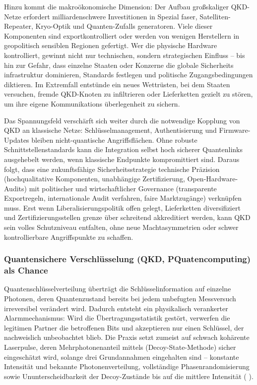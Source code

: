 {Hinzu kommt die makroökonomische Dimension: Der Aufbau großskaliger QKD-Netze erfordert milliardenschwere Investitionen in Spezial faser, Satelliten-Repeater, Kryo-Optik und Quanten-Zufalls generatoren. Viele dieser Komponenten sind exportkontrolliert oder werden von wenigen Herstellern in geopolitisch sensiblen Regionen gefertigt. Wer die physische Hardware kontrolliert, gewinnt nicht nur technischen, sondern strategischen Einfluss – bis hin zur Gefahr, dass einzelne Staaten oder Konzerne die globale Sicherheits infrastruktur dominieren, Standards festlegen und politische Zugangsbedingungen diktieren. Im Extremfall entstünde ein neues Wettrüsten, bei dem Staaten versuchen, fremde QKD-Knoten zu infiltrieren oder Lieferketten gezielt zu stören, um ihre eigene Kommunikations überlegenheit zu sichern.

Das Spannungsfeld verschärft sich weiter durch die notwendige Kopplung von QKD an klassische Netze: Schlüsselmanagement, Authentisierung und Firmware-Updates bleiben nicht-quantische Angriffsflächen. Ohne robuste Schnittstellenstandards kann die Integration selbst hoch sicherer Quantenlinks ausgehebelt werden, wenn klassische Endpunkte kompromittiert sind. Daraus folgt, dass eine zukunftsfähige Sicherheitsstrategie technische Präzision (hochqualitative Komponenten, unabhängige Zertifizierung, Open-Hardware-Audits) mit politischer und wirtschaftlicher Governance (transparente Exportregeln, internationale Audit verfahren, faire Marktzugänge) verknüpfen muss. Erst wenn Liberalisierungspolitik offen gelegt, Lieferketten diversifiziert und Zertifizierungsstellen grenze über schreitend akkreditiert werden, kann QKD sein volles Schutzniveau entfalten, ohne neue Machtasymmetrien oder schwer kontrollierbare Angriffspunkte zu schaffen. 
\cite{sunReviewSecurityEvaluation2022} 

\subsubsection{Quantensichere Verschlüsselung (QKD, PQuatencomputing) als Chance}

Quantenschlüsselverteilung überträgt die Schlüsselinformation auf einzelne Photonen, deren Quantenzustand bereits bei jedem unbefugten Messversuch irreversibel verändert wird. Dadurch entsteht ein physikalisch verankerter Alarmmechanismus: Wird die Übertragungsstatistik gestört, verwerfen die legitimen Partner die betroffenen Bits und akzeptieren nur einen Schlüssel, der nachweislich unbeobachtet blieb. Die Praxis setzt zumeist auf schwach kohärente Laserpulse, deren Mehrphotonenanteil mittels (Decoy-State-Methode) sicher eingeschätzt wird, solange drei Grundannahmen eingehalten sind – konstante Intensität und bekannte Photonenverteilung, vollständige Phasenrandomisierung sowie Ununterscheidbarkeit der Decoy-Zustände bis auf die mittlere Intensität (\cite{sunReviewSecurityEvaluation2022} ).

}
